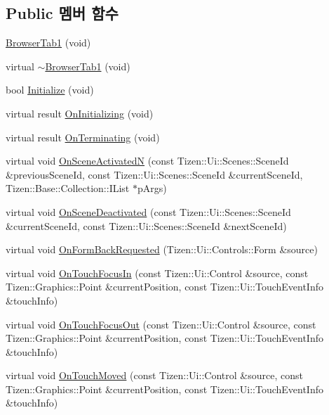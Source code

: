 \subsection*{Public 멤버 함수}
\begin{DoxyCompactItemize}
\item 
\hyperlink{class_browser_tab1_a42e0e4ea28b2debcfb5ee0e5dc2ecf09}{Browser\+Tab1} (void)
\item 
virtual \hyperlink{class_browser_tab1_ad1024dd5d5945a5d29be9306d5ae3013}{$\sim$\+Browser\+Tab1} (void)
\item 
bool \hyperlink{class_browser_tab1_ae8f2b22d3dd917b599c7f46549079687}{Initialize} (void)
\item 
virtual result \hyperlink{class_browser_tab1_ab3fa028108d66af5fa6bbe088cf44e5f}{On\+Initializing} (void)
\item 
virtual result \hyperlink{class_browser_tab1_aa87b7496a627892df34a96138337d7ca}{On\+Terminating} (void)
\item 
virtual void \hyperlink{class_browser_tab1_a6a40e7124eb0c67a3986b4122befe3d5}{On\+Scene\+Activated\+N} (const Tizen\+::\+Ui\+::\+Scenes\+::\+Scene\+Id \&previous\+Scene\+Id, const Tizen\+::\+Ui\+::\+Scenes\+::\+Scene\+Id \&current\+Scene\+Id, Tizen\+::\+Base\+::\+Collection\+::\+I\+List $\ast$p\+Args)
\item 
virtual void \hyperlink{class_browser_tab1_a572592e61e494f61b62b71e60270ef1d}{On\+Scene\+Deactivated} (const Tizen\+::\+Ui\+::\+Scenes\+::\+Scene\+Id \&current\+Scene\+Id, const Tizen\+::\+Ui\+::\+Scenes\+::\+Scene\+Id \&next\+Scene\+Id)
\item 
virtual void \hyperlink{class_browser_tab1_a535e5fc3e6a2e82ad029be81652d5509}{On\+Form\+Back\+Requested} (Tizen\+::\+Ui\+::\+Controls\+::\+Form \&source)
\item 
virtual void \hyperlink{class_browser_tab1_a5da5021cbb84ac88708ed984e1eca853}{On\+Touch\+Focus\+In} (const Tizen\+::\+Ui\+::\+Control \&source, const Tizen\+::\+Graphics\+::\+Point \&current\+Position, const Tizen\+::\+Ui\+::\+Touch\+Event\+Info \&touch\+Info)
\item 
virtual void \hyperlink{class_browser_tab1_ae25d906cbfcd2505a3669111d672e79b}{On\+Touch\+Focus\+Out} (const Tizen\+::\+Ui\+::\+Control \&source, const Tizen\+::\+Graphics\+::\+Point \&current\+Position, const Tizen\+::\+Ui\+::\+Touch\+Event\+Info \&touch\+Info)
\item 
virtual void \hyperlink{class_browser_tab1_a7d70ed9cfa3f2ed1df6d0aeacb21ee48}{On\+Touch\+Moved} (const Tizen\+::\+Ui\+::\+Control \&source, const Tizen\+::\+Graphics\+::\+Point \&current\+Position, const Tizen\+::\+Ui\+::\+Touch\+Event\+Info \&touch\+Info)

\end{DoxyCompactItemize}
